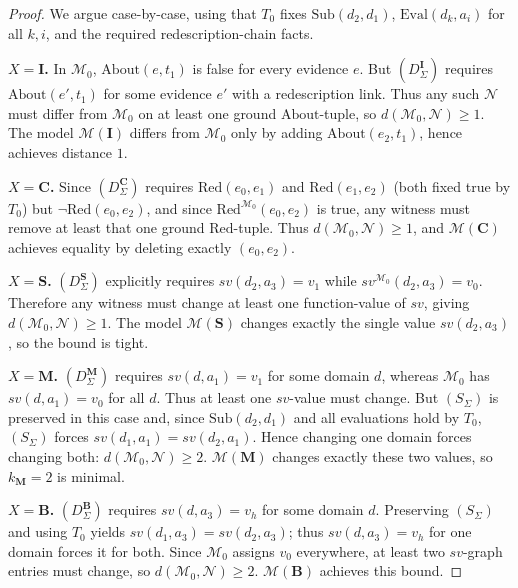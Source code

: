 \documentclass[12pt]{article}
\begin{document}
\begin{proof}
We argue case-by-case, using that $T_0$ fixes $\mathrm{Sub}(d_2,d_1)$, $\mathrm{Eval}(d_k,a_i)$ for all $k,i$, and the required redescription-chain facts.

\textbf{$X=\mathbf{I}$.}
In $\mathcal{M}_0$, $\mathrm{About}(e,t_1)$ is false for every evidence $e$.
But $(D^{\mathbf{I}}_\Sigma)$ requires $\mathrm{About}(e',t_1)$ for some evidence $e'$ with a redescription link.
Thus any such $\mathcal{N}$ must differ from $\mathcal{M}_0$ on at least one ground $\mathrm{About}$-tuple, so $d(\mathcal{M}_0,\mathcal{N})\ge 1$.
The model $\mathcal{M}(\mathbf{I})$ differs from $\mathcal{M}_0$ only by adding $\mathrm{About}(e_2,t_1)$, hence achieves distance $1$.

\textbf{$X=\mathbf{C}$.}
Since $(D^{\mathbf{C}}_\Sigma)$ requires $\mathrm{Red}(e_0,e_1)$ and $\mathrm{Red}(e_1,e_2)$ (both fixed true by $T_0$) but $\neg\mathrm{Red}(e_0,e_2)$,
and since $\mathrm{Red}^{\mathcal{M}_0}(e_0,e_2)$ is true, any witness must remove at least that one ground $\mathrm{Red}$-tuple.
Thus $d(\mathcal{M}_0,\mathcal{N})\ge 1$, and $\mathcal{M}(\mathbf{C})$ achieves equality by deleting exactly $(e_0,e_2)$.

\textbf{$X=\mathbf{S}$.}
$(D^{\mathbf{S}}_\Sigma)$ explicitly requires $sv(d_2,a_3)=v_1$ while $sv^{\mathcal{M}_0}(d_2,a_3)=v_0$.
Therefore any witness must change at least one function-value of $sv$, giving $d(\mathcal{M}_0,\mathcal{N})\ge 1$.
The model $\mathcal{M}(\mathbf{S})$ changes exactly the single value $sv(d_2,a_3)$, so the bound is tight.

\textbf{$X=\mathbf{M}$.}
$(D^{\mathbf{M}}_\Sigma)$ requires $sv(d,a_1)=v_1$ for some domain $d$, whereas $\mathcal{M}_0$ has $sv(d,a_1)=v_0$ for all $d$.
Thus at least one $sv$-value must change. But $(S_\Sigma)$ is preserved in this case and, since $\mathrm{Sub}(d_2,d_1)$ and all evaluations hold by $T_0$,
$(S_\Sigma)$ forces $sv(d_1,a_1)=sv(d_2,a_1)$. Hence changing one domain forces changing both: $d(\mathcal{M}_0,\mathcal{N})\ge 2$.
$\mathcal{M}(\mathbf{M})$ changes exactly these two values, so $k_{\mathbf{M}}=2$ is minimal.

\textbf{$X=\mathbf{B}$.}
$(D^{\mathbf{B}}_\Sigma)$ requires $sv(d,a_3)=v_h$ for some domain $d$.
Preserving $(S_\Sigma)$ and using $T_0$ yields $sv(d_1,a_3)=sv(d_2,a_3)$; thus $sv(d,a_3)=v_h$ for one domain forces it for both.
Since $\mathcal{M}_0$ assigns $v_0$ everywhere, at least two $sv$-graph entries must change, so $d(\mathcal{M}_0,\mathcal{N})\ge 2$.
$\mathcal{M}(\mathbf{B})$ achieves this bound.


\end{proof}
\end{document}
